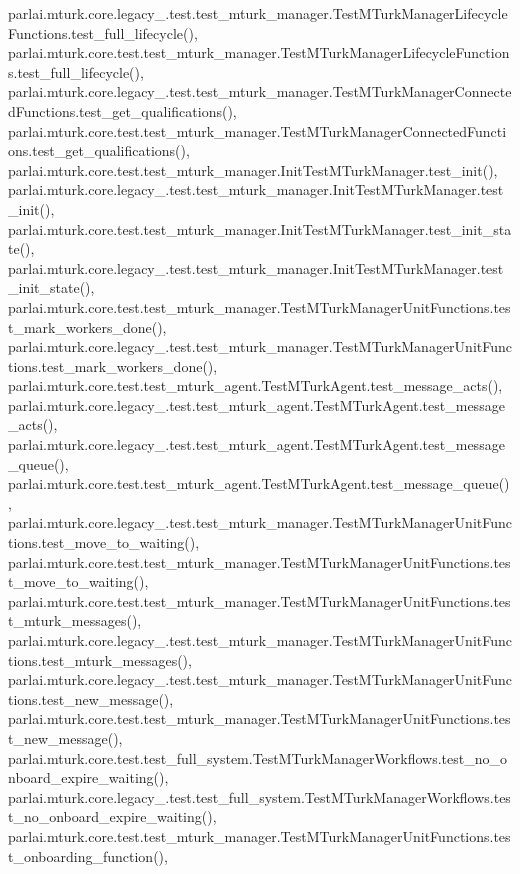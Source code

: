 parlai.\+mturk.\+core.\+legacy\+\_.\+test.\+test\+\_\+mturk\+\_\+manager.\+Test\+M\+Turk\+Manager\+Lifecycle\+Functions.\+test\+\_\+full\+\_\+lifecycle(), parlai.\+mturk.\+core.\+test.\+test\+\_\+mturk\+\_\+manager.\+Test\+M\+Turk\+Manager\+Lifecycle\+Functions.\+test\+\_\+full\+\_\+lifecycle(), parlai.\+mturk.\+core.\+legacy\+\_.\+test.\+test\+\_\+mturk\+\_\+manager.\+Test\+M\+Turk\+Manager\+Connected\+Functions.\+test\+\_\+get\+\_\+qualifications(), parlai.\+mturk.\+core.\+test.\+test\+\_\+mturk\+\_\+manager.\+Test\+M\+Turk\+Manager\+Connected\+Functions.\+test\+\_\+get\+\_\+qualifications(), parlai.\+mturk.\+core.\+test.\+test\+\_\+mturk\+\_\+manager.\+Init\+Test\+M\+Turk\+Manager.\+test\+\_\+init(), parlai.\+mturk.\+core.\+legacy\+\_.\+test.\+test\+\_\+mturk\+\_\+manager.\+Init\+Test\+M\+Turk\+Manager.\+test\+\_\+init(), parlai.\+mturk.\+core.\+test.\+test\+\_\+mturk\+\_\+manager.\+Init\+Test\+M\+Turk\+Manager.\+test\+\_\+init\+\_\+state(), parlai.\+mturk.\+core.\+legacy\+\_.\+test.\+test\+\_\+mturk\+\_\+manager.\+Init\+Test\+M\+Turk\+Manager.\+test\+\_\+init\+\_\+state(), parlai.\+mturk.\+core.\+test.\+test\+\_\+mturk\+\_\+manager.\+Test\+M\+Turk\+Manager\+Unit\+Functions.\+test\+\_\+mark\+\_\+workers\+\_\+done(), parlai.\+mturk.\+core.\+legacy\+\_.\+test.\+test\+\_\+mturk\+\_\+manager.\+Test\+M\+Turk\+Manager\+Unit\+Functions.\+test\+\_\+mark\+\_\+workers\+\_\+done(), parlai.\+mturk.\+core.\+test.\+test\+\_\+mturk\+\_\+agent.\+Test\+M\+Turk\+Agent.\+test\+\_\+message\+\_\+acts(), parlai.\+mturk.\+core.\+legacy\+\_.\+test.\+test\+\_\+mturk\+\_\+agent.\+Test\+M\+Turk\+Agent.\+test\+\_\+message\+\_\+acts(), parlai.\+mturk.\+core.\+legacy\+\_.\+test.\+test\+\_\+mturk\+\_\+agent.\+Test\+M\+Turk\+Agent.\+test\+\_\+message\+\_\+queue(), parlai.\+mturk.\+core.\+test.\+test\+\_\+mturk\+\_\+agent.\+Test\+M\+Turk\+Agent.\+test\+\_\+message\+\_\+queue(), parlai.\+mturk.\+core.\+legacy\+\_.\+test.\+test\+\_\+mturk\+\_\+manager.\+Test\+M\+Turk\+Manager\+Unit\+Functions.\+test\+\_\+move\+\_\+to\+\_\+waiting(), parlai.\+mturk.\+core.\+test.\+test\+\_\+mturk\+\_\+manager.\+Test\+M\+Turk\+Manager\+Unit\+Functions.\+test\+\_\+move\+\_\+to\+\_\+waiting(), parlai.\+mturk.\+core.\+test.\+test\+\_\+mturk\+\_\+manager.\+Test\+M\+Turk\+Manager\+Unit\+Functions.\+test\+\_\+mturk\+\_\+messages(), parlai.\+mturk.\+core.\+legacy\+\_.\+test.\+test\+\_\+mturk\+\_\+manager.\+Test\+M\+Turk\+Manager\+Unit\+Functions.\+test\+\_\+mturk\+\_\+messages(), parlai.\+mturk.\+core.\+legacy\+\_.\+test.\+test\+\_\+mturk\+\_\+manager.\+Test\+M\+Turk\+Manager\+Unit\+Functions.\+test\+\_\+new\+\_\+message(), parlai.\+mturk.\+core.\+test.\+test\+\_\+mturk\+\_\+manager.\+Test\+M\+Turk\+Manager\+Unit\+Functions.\+test\+\_\+new\+\_\+message(), parlai.\+mturk.\+core.\+test.\+test\+\_\+full\+\_\+system.\+Test\+M\+Turk\+Manager\+Workflows.\+test\+\_\+no\+\_\+onboard\+\_\+expire\+\_\+waiting(), parlai.\+mturk.\+core.\+legacy\+\_.\+test.\+test\+\_\+full\+\_\+system.\+Test\+M\+Turk\+Manager\+Workflows.\+test\+\_\+no\+\_\+onboard\+\_\+expire\+\_\+waiting(), parlai.\+mturk.\+core.\+test.\+test\+\_\+mturk\+\_\+manager.\+Test\+M\+Turk\+Manager\+Unit\+Functions.\+test\+\_\+onboarding\+\_\+function(), 